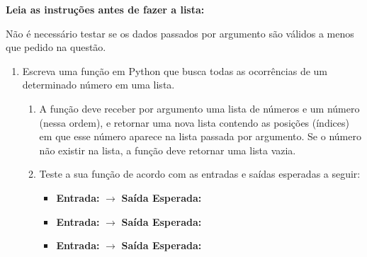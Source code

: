 
\vspace{1cm}

\noindent  \textbf{Leia as instruções antes de fazer a lista:}

\vspace{0.3cm}
\noindent  Não é necessário testar se os dados passados por argumento são válidos a menos que pedido na questão.


\vspace{0.5cm}


\begin{enumerate}[label=\textbf{Q\arabic*.}]



    \item Escreva uma função em Python que busca todas as ocorrências de um determinado número em uma lista.
    \begin{enumerate}[label=\alph*)]
        \item A função deve receber por argumento uma lista de números e um número (nessa ordem), e retornar uma nova lista contendo as posições (índices) em que esse número aparece na lista passada por argumento. Se o número não existir na lista, a função deve retornar uma lista vazia.
        \item Teste a sua função de acordo com as entradas e saídas esperadas a seguir:
        \begin{itemize}
            \item \textbf{Entrada:}  $\rightarrow$ \textbf{Saída Esperada:} \code{[1, 3, 5]}
            \item \textbf{Entrada:}  $\rightarrow$ \textbf{Saída Esperada:} \code{[]}
            \item \textbf{Entrada:}  $\rightarrow$ \textbf{Saída Esperada:} \code{[]}
        \end{itemize}
    \end{enumerate}

    \vspace{0.5cm}

    


\end{enumerate}

